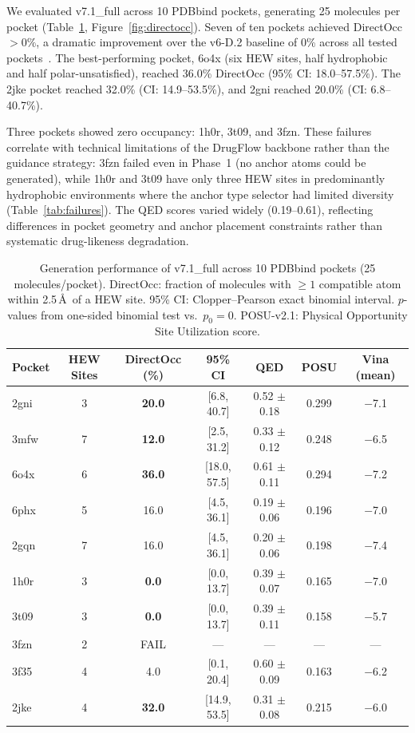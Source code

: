\documentclass[11pt,letterpaper]{article}
\begin{document}
We evaluated v7.1\_full across 10 PDBbind pockets, generating 25 molecules per
pocket (Table~\ref{tab:main}, Figure~\ref{fig:directocc}).  Seven of ten pockets
achieved DirectOcc $> 0\%$, a dramatic improvement over the v6-D.2 baseline of
0\% across all tested pockets~\cite{esfield2026}.  The best-performing pocket,
6o4x (six HEW sites, half hydrophobic and half polar-unsatisfied), reached
36.0\% DirectOcc (95\% CI: 18.0--57.5\%).  The 2jke pocket reached 32.0\%
(CI: 14.9--53.5\%), and 2gni reached 20.0\% (CI: 6.8--40.7\%).

Three pockets showed zero occupancy: 1h0r, 3t09, and 3fzn.  These failures
correlate with technical limitations of the DrugFlow backbone rather than the
guidance strategy: 3fzn failed even in Phase~1 (no anchor atoms could be
generated), while 1h0r and 3t09 have only three HEW sites in predominantly
hydrophobic environments where the anchor type selector had limited diversity
(Table~\ref{tab:failures}).  The QED scores varied widely (0.19--0.61),
reflecting differences in pocket geometry and anchor placement constraints
rather than systematic drug-likeness degradation.

\begin{table}[H]
  \centering
  \caption{Generation performance of v7.1\_full across 10 PDBbind pockets
           (25 molecules/pocket).  DirectOcc: fraction of molecules with
           $\ge 1$ compatible atom within 2.5\,\AA\ of a HEW site.
           95\% CI: Clopper--Pearson exact binomial interval.
           $p$-values from one-sided binomial test vs.\ $p_0 = 0$.
           POSU-v2.1: Physical Opportunity Site Utilization score.}
  \label{tab:main}
  \small
  \begin{tabular}{l c c c c c c}
    \toprule
    \textbf{Pocket} & \textbf{HEW Sites} & \textbf{DirectOcc (\%)} & \textbf{95\% CI} & \textbf{QED} & \textbf{POSU} & \textbf{Vina (mean)} \\
    \midrule
    2gni & 3 & \textbf{20.0} & [6.8, 40.7] & 0.52 $\pm$ 0.18 & 0.299 & $-$7.1 \\
    3mfw & 7 & \textbf{12.0} & [2.5, 31.2] & 0.33 $\pm$ 0.12 & 0.248 & $-$6.5 \\
    6o4x & 6 & \textbf{36.0} & [18.0, 57.5] & 0.61 $\pm$ 0.11 & 0.294 & $-$7.2 \\
    6phx & 5 & 16.0 & [4.5, 36.1] & 0.19 $\pm$ 0.06 & 0.196 & $-$7.0 \\
    2gqn & 7 & 16.0 & [4.5, 36.1] & 0.20 $\pm$ 0.06 & 0.198 & $-$7.4 \\
    1h0r & 3 & \textbf{0.0} & [0.0, 13.7] & 0.39 $\pm$ 0.07 & 0.165 & $-$7.0 \\
    3t09 & 3 & \textbf{0.0} & [0.0, 13.7] & 0.39 $\pm$ 0.11 & 0.158 & $-$5.7 \\
    3fzn & 2 & FAIL & --- & --- & --- & --- \\
    3f35 & 4 & 4.0 & [0.1, 20.4] & 0.60 $\pm$ 0.09 & 0.163 & $-$6.2 \\
    2jke & 4 & \textbf{32.0} & [14.9, 53.5] & 0.31 $\pm$ 0.08 & 0.215 & $-$6.0 \\
    \bottomrule
  \end{tabular}
\end{table}
\end{document}
